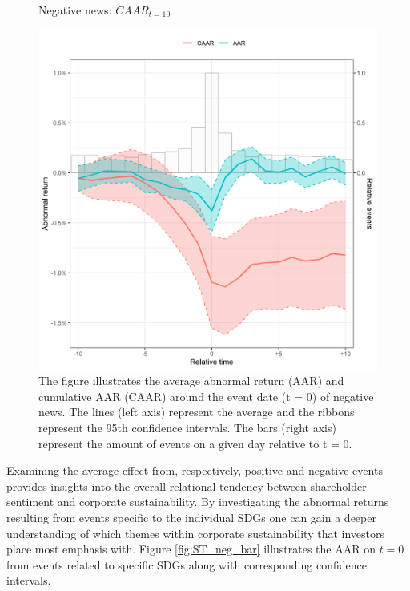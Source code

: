 \begin{figure} [H]
    \centering
    \caption{Negative news: $CAAR_{t=10}$}
    \includegraphics[scale=0.6]{Projekt/1.Figures analysis/ST_negative_all_CI.png}
     \caption*{\footnotesize The figure illustrates the average abnormal return (AAR) and cumulative AAR (CAAR) around the event date (t = 0) of negative news. The lines (left axis) represent the average and the ribbons represent the 95th confidence intervals. The bars (right axis) represent the amount of events on a given day relative to t = 0. }
    \label{fig:ST_neg_news}
\end{figure} 

Examining the average effect from, respectively, positive and negative events provides insights into the overall relational tendency between shareholder sentiment and corporate sustainability. By investigating the abnormal returns resulting from events specific to the individual SDGs one can gain a deeper understanding of which themes within corporate sustainability that investors place most emphasis with. Figure \ref{fig:ST_neg_bar} illustrates the AAR on $t=0$ from events related to specific SDGs along with corresponding confidence intervals. 

